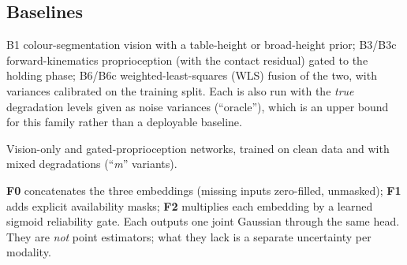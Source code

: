 \documentclass[11pt,a4paper]{article}
\begin{document}
\subsection{Baselines}
\begin{description}[leftmargin=1em]
\item[Classical (no learning).] B1 colour-segmentation vision with a table-height or broad-height prior; B3/B3c forward-kinematics proprioception (with the contact residual) gated to the holding phase; B6/B6c weighted-least-squares (WLS) fusion of the two, with variances calibrated on the training split. Each is also run with the \emph{true} degradation levels given as noise variances (``oracle''), which is an upper bound for this family rather than a deployable baseline.
\item[Learned unimodal.] Vision-only and gated-proprioception networks, trained on clean data and with mixed degradations (``\emph{m}'' variants).
\item[Learned non-uncertainty-aware fusion.] \textbf{F0} concatenates the three embeddings (missing inputs zero-filled, unmasked); \textbf{F1} adds explicit availability masks; \textbf{F2} multiplies each embedding by a learned sigmoid reliability gate. Each outputs one joint Gaussian through the same head. They are \emph{not} point estimators; what they lack is a separate uncertainty per modality.
\end{description}
\end{document}
